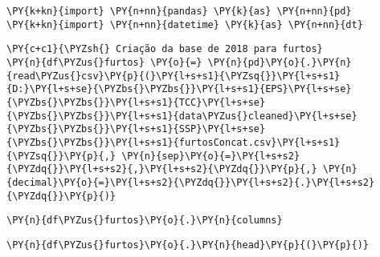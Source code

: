 \begin{tcolorbox}[breakable, size=fbox, boxrule=1pt, pad at break*=1mm,colback=cellbackground, colframe=cellborder]
\begin{Verbatim}[commandchars=\\\{\}]
\PY{k+kn}{import} \PY{n+nn}{pandas} \PY{k}{as} \PY{n+nn}{pd}
\PY{k+kn}{import} \PY{n+nn}{datetime} \PY{k}{as} \PY{n+nn}{dt}
\end{Verbatim}
\end{tcolorbox}


    \begin{tcolorbox}[breakable, size=fbox, boxrule=1pt, pad at break*=1mm,colback=cellbackground, colframe=cellborder]
\begin{Verbatim}[commandchars=\\\{\}]
\PY{c+c1}{\PYZsh{} Criação da base de 2018 para furtos}
\PY{n}{df\PYZus{}furtos} \PY{o}{=} \PY{n}{pd}\PY{o}{.}\PY{n}{read\PYZus{}csv}\PY{p}{(}\PY{l+s+s1}{\PYZsq{}}\PY{l+s+s1}{D:}\PY{l+s+se}{\PYZbs{}\PYZbs{}}\PY{l+s+s1}{EPS}\PY{l+s+se}{\PYZbs{}\PYZbs{}}\PY{l+s+s1}{TCC}\PY{l+s+se}{\PYZbs{}\PYZbs{}}\PY{l+s+s1}{data\PYZus{}cleaned}\PY{l+s+se}{\PYZbs{}\PYZbs{}}\PY{l+s+s1}{SSP}\PY{l+s+se}{\PYZbs{}\PYZbs{}}\PY{l+s+s1}{furtosConcat.csv}\PY{l+s+s1}{\PYZsq{}}\PY{p}{,} \PY{n}{sep}\PY{o}{=}\PY{l+s+s2}{\PYZdq{}}\PY{l+s+s2}{,}\PY{l+s+s2}{\PYZdq{}}\PY{p}{,} \PY{n}{decimal}\PY{o}{=}\PY{l+s+s2}{\PYZdq{}}\PY{l+s+s2}{.}\PY{l+s+s2}{\PYZdq{}}\PY{p}{)}
\end{Verbatim}
\end{tcolorbox}

    \begin{tcolorbox}[breakable, size=fbox, boxrule=1pt, pad at break*=1mm,colback=cellbackground, colframe=cellborder]
\begin{Verbatim}[commandchars=\\\{\}]
\PY{n}{df\PYZus{}furtos}\PY{o}{.}\PY{n}{columns}
\end{Verbatim}
\end{tcolorbox}

    \begin{tcolorbox}[breakable, size=fbox, boxrule=1pt, pad at break*=1mm,colback=cellbackground, colframe=cellborder]
\begin{Verbatim}[commandchars=\\\{\}]
\PY{n}{df\PYZus{}furtos}\PY{o}{.}\PY{n}{head}\PY{p}{(}\PY{p}{)}
\end{Verbatim}
\end{tcolorbox}

